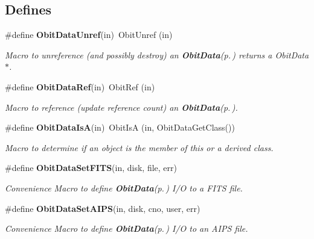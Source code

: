 \subsection*{Defines}
\begin{CompactItemize}
\item 
\#define {\bf Obit\-Data\-Unref}(in)\ Obit\-Unref (in)
\begin{CompactList}\small\item\em Macro to unreference (and possibly destroy) an {\bf Obit\-Data}{\rm (p.\,\pageref{structObitData})} returns a Obit\-Data$\ast$. \item\end{CompactList}\item 
\#define {\bf Obit\-Data\-Ref}(in)\ Obit\-Ref (in)
\begin{CompactList}\small\item\em Macro to reference (update reference count) an {\bf Obit\-Data}{\rm (p.\,\pageref{structObitData})}. \item\end{CompactList}\item 
\#define {\bf Obit\-Data\-Is\-A}(in)\ Obit\-Is\-A (in, Obit\-Data\-Get\-Class())
\begin{CompactList}\small\item\em Macro to determine if an object is the member of this or a derived class. \item\end{CompactList}\item 
\#define {\bf Obit\-Data\-Set\-FITS}(in, disk, file, err)
\begin{CompactList}\small\item\em Convenience Macro to define {\bf Obit\-Data}{\rm (p.\,\pageref{structObitData})} I/O to a FITS file. \item\end{CompactList}\item 
\#define {\bf Obit\-Data\-Set\-AIPS}(in, disk, cno, user, err)
\begin{CompactList}\small\item\em Convenience Macro to define {\bf Obit\-Data}{\rm (p.\,\pageref{structObitData})} I/O to an AIPS file. \item\end{CompactList}\end{CompactItemize}
